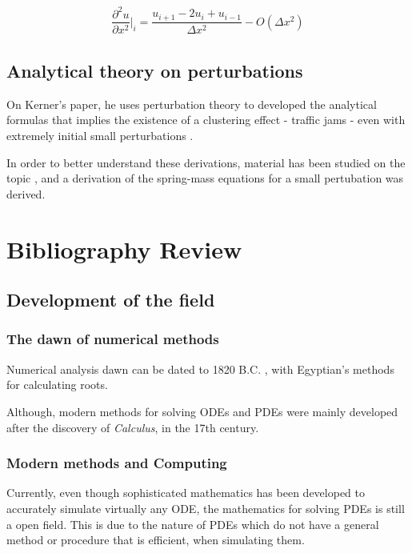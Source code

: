\documentclass[11pt]{article}
\begin{document}
\begin{equation}
\begin{aligned}
\dfrac{\partial^2{u}}{\partial{x^2}}\biggr\rvert_i = \dfrac{u_{i+1}-2u_i+u_{i-1}}{\Delta{x^2}} - O(\Delta{x^2})
\end{aligned}
\end{equation}

\subsection{Analytical theory on perturbations}
\label{sec:org838b447}
On Kerner's paper, he uses perturbation theory to developed the analytical
formulas that implies the existence of a clustering effect - traffic jams - even
with extremely initial small perturbations \cite{kerner1993}.

In order to better understand these derivations, material has been studied on
the topic \cite{tremblay2017phy}, and a derivation of the spring-mass equations for a small pertubation
was derived.

\section{Bibliography Review}
\label{sec:orgeb24ab2}
\subsection{Development of the field}
\label{sec:orgcbdf3bb}
\subsubsection{The dawn of numerical methods}
\label{sec:org2e45f14}
Numerical analysis dawn can be dated to
1820 B.C. \cite{smith1930rhind}, with Egyptian's methods for
calculating roots.

Although, modern methods for solving ODEs and PDEs were mainly
developed after the discovery of \emph{Calculus}, in the 17th century.

\subsubsection{Modern methods and Computing}
\label{sec:org46fcfcf}
Currently, even though sophisticated mathematics has been
developed to accurately simulate virtually any ODE, the mathematics
for solving PDEs is still a open field. This is due to the nature of
PDEs which do not have a general method or procedure that is
efficient, when simulating them.
\end{document}

